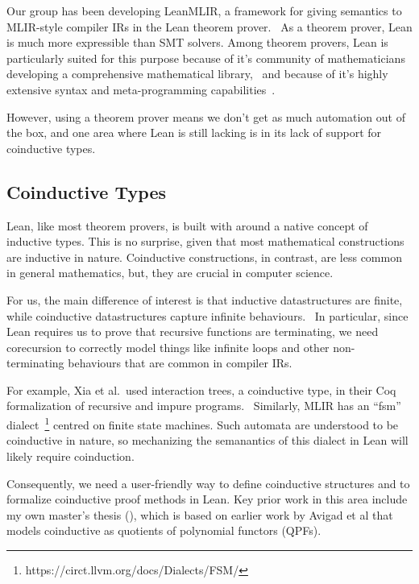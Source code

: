 \documentclass[a4paper]{scrartcl}
\begin{document}
Our group has been developing
LeanMLIR, a framework for giving
semantics to MLIR-style compiler IRs in the Lean theorem prover.~\cite{demouraLeanTheoremProver2015} As a theorem prover, Lean is
much more expressible than SMT solvers. Among theorem provers, Lean is
particularly suited for this purpose because of it's community of
mathematicians developing a comprehensive mathematical library,~\cite{themathlibcommunityLeanMathematicalLibrary2020} 
and because of it's highly extensive syntax and meta-programming capabilities~\cite{ullrichNotationsHygienicMacro2022, paulinoMetaprogrammingLean}.

However, using a theorem prover means we don't get as much automation
out of the box, and one area where Lean is still lacking is in its lack
of support for coinductive types.


\subsection{Coinductive Types}\label{coinductive-types}

Lean, like most theorem provers, is built with around a native concept
of inductive types. This is no surprise, given that most mathematical
constructions are inductive in nature. Coinductive constructions, in
contrast, are less common in general mathematics, but, they are crucial
in computer science.

For us, the main difference of interest is that inductive datastructures
are finite, while coinductive datastructures capture infinite
behaviours.~\cite{sangiorgiIntroductionBisimulationCoinduction2011}
In particular, since Lean requires us to prove that recursive functions are
terminating, we need corecursion to correctly model things like infinite
loops and other non-terminating behaviours that are common in compiler
IRs.

For example, Xia et al.~used interaction trees, a coinductive type, in
their Coq formalization of recursive and impure programs.~\cite{xiaInteractionTreesRepresenting2020} Similarly, MLIR has an
``fsm'' dialect~\footnote{https://circt.llvm.org/docs/Dialects/FSM/}
centred on finite state machines. Such automata are understood to be
coinductive in nature, so mechanizing the semanantics of this dialect in
Lean will likely require coinduction.

Consequently, we need a user-friendly way to define coinductive
structures and to formalize coinductive proof methods in Lean. Key prior
work in this area include my own master's thesis (\cite{keizerImplementingDefinitionalCo}), 
which is based on earlier
work by Avigad et al that models coinductive as quotients of polynomial
functors (QPFs).~\cite{avigadDataTypesQuotients2019}
\end{document}
